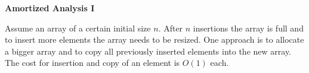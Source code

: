 \question \textbf{Amortized Analysis I}

Assume an array of a certain initial size \(n\). After \(n\) insertions the array is full and to insert more elements the array needs to be resized. One approach is to allocate a bigger array and to copy all previously inserted elements into the new array. The cost for insertion and copy of an element is \(O(1)\) each.

